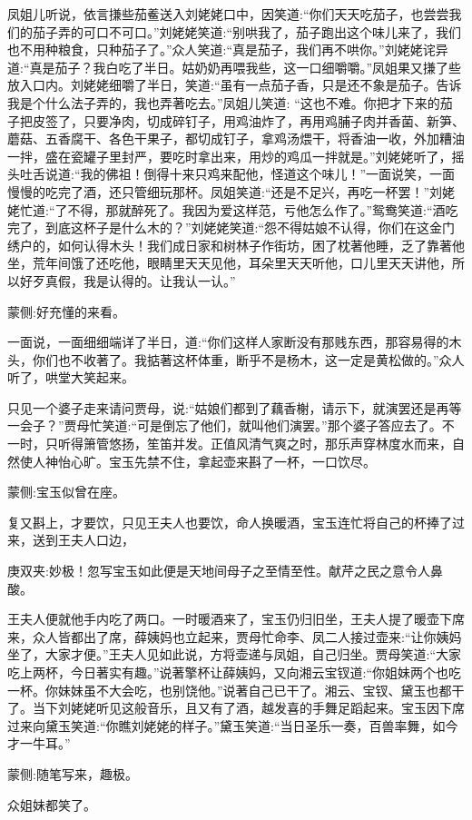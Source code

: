 \begin{parag}
凤姐儿听说，依言搛些茄鲝送入刘姥姥口中，因笑道:“你们天天吃茄子，也尝尝我们的茄子弄的可口不可口。”刘姥姥笑道:“别哄我了，茄子跑出这个味儿来了，我们也不用种粮食，只种茄子了。”众人笑道:“真是茄子，我们再不哄你。”刘姥姥诧异道:“真是茄子？我白吃了半日。姑奶奶再喂我些，这一口细嚼嚼。”凤姐果又搛了些放入口内。刘姥姥细嚼了半日，笑道:“虽有一点茄子香，只是还不象是茄子。告诉我是个什么法子弄的，我也弄著吃去。”凤姐儿笑道: “这也不难。你把才下来的茄子把皮签了，只要净肉，切成碎钉子，用鸡油炸了，再用鸡脯子肉并香菌、新笋、蘑菇、五香腐干、各色干果子，都切成钉子，拿鸡汤煨干，将香油一收，外加糟油一拌，盛在瓷罐子里封严，要吃时拿出来，用炒的鸡瓜一拌就是。”刘姥姥听了，摇头吐舌说道:“我的佛祖！倒得十来只鸡来配他，怪道这个味儿！”一面说笑，一面慢慢的吃完了酒，还只管细玩那杯。凤姐笑道:“还是不足兴，再吃一杯罢！”刘姥姥忙道:“了不得，那就醉死了。我因为爱这样范，亏他怎么作了。”鸳鸯笑道:“酒吃完了，到底这杯子是什么木的？”刘姥姥笑道:“怨不得姑娘不认得，你们在这金门绣户的，如何认得木头！我们成日家和树林子作街坊，困了枕著他睡，乏了靠著他坐，荒年间饿了还吃他，眼睛里天天见他，耳朵里天天听他，口儿里天天讲他，所以好歹真假，我是认得的。让我认一认。”\begin{note}蒙侧:好充懂的来看。\end{note}一面说，一面细细端详了半日，道:“你们这样人家断没有那贱东西，那容易得的木头，你们也不收著了。我掂著这杯体重，断乎不是杨木，这一定是黄松做的。”众人听了，哄堂大笑起来。
\end{parag}


\begin{parag}
    只见一个婆子走来请问贾母，说:“姑娘们都到了藕香榭，请示下，就演罢还是再等一会子？”贾母忙笑道:“可是倒忘了他们，就叫他们演罢。”那个婆子答应去了。不一时，只听得箫管悠扬，笙笛并发。正值风清气爽之时，那乐声穿林度水而来，自然使人神怡心旷。宝玉先禁不住，拿起壶来斟了一杯，一口饮尽。\begin{note}蒙侧:宝玉似曾在座。\end{note}复又斟上，才要饮，只见王夫人也要饮，命人换暖酒，宝玉连忙将自己的杯捧了过来，送到王夫人口边，\begin{note}庚双夹:妙极！忽写宝玉如此便是天地间母子之至情至性。献芹之民之意令人鼻酸。\end{note}王夫人便就他手内吃了两口。一时暖酒来了，宝玉仍归旧坐，王夫人提了暖壶下席来，众人皆都出了席，薛姨妈也立起来，贾母忙命李、凤二人接过壶来:“让你姨妈坐了，大家才便。”王夫人见如此说，方将壶递与凤姐，自己归坐。贾母笑道:“大家吃上两杯，今日著实有趣。”说著擎杯让薛姨妈，又向湘云宝钗道:“你姐妹两个也吃一杯。你妹妹虽不大会吃，也别饶他。”说著自己已干了。湘云、宝钗、黛玉也都干了。当下刘姥姥听见这般音乐，且又有了酒，越发喜的手舞足蹈起来。宝玉因下席过来向黛玉笑道:“你瞧刘姥姥的样子。”黛玉笑道:“当日圣乐一奏，百兽率舞，如今才一牛耳。”\begin{note}蒙侧:随笔写来，趣极。\end{note}众姐妹都笑了。
\end{parag}



